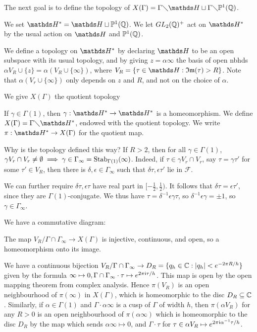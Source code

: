 \documentclass[10pt,a4paper]{article}
\begin{document}
The next goal is to define the topology of $X(\Gamma) = \Gamma \diagdown \H \sqcup \Gamma \diagdown \P^1(\Q)$.
\begin{definition}
  We set $\H^\ast = \H \sqcup \P^1(\Q)$. We let $GL_2(\mathbb{Q})^+$ act on $\H^\ast$ by the usual action on $\H$ and $\mathbb{P}^1(\mathbb{Q})$.

  We define a topology on $\H^\ast$ by declaring $\H$ to be an open subspace with its usual topology, and by giving $z = \alpha\infty$ the basis of open nbhds $\alpha V_R \cup \{z\} = \alpha(V_R \cup \{\infty\})$, where $V_R = \{\tau \in \H: \Im(\tau) > R\}$. Note that $\alpha(V_r \cup \{\infty\})$ only depends on $z$ and $R$, and not on the choice of $\alpha$.

  We give $X(\Gamma)$ the quotient topology
\end{definition}
If $\gamma \in \Gamma(1)$, then $\gamma:\H^\ast  \to \H^\ast$ is a homeomorphism. We define $X(\Gamma) = \Gamma \diagdown \H^\ast$, endowed with the quotient topology. We write $\pi : \H^\ast \to X(\Gamma)$ for the quotient map.

Why is the topology defined this way? If $R>2$, then for all $\gamma \in \Gamma(1)$, $\gamma V_r \cap V_r \neq \emptyset \implies \gamma \in \Gamma_\infty = \operatorname{Stab}_{\Gamma(1)}(\infty)$. Indeed, if $\tau \in \gamma V_r \cap V_r$, say $\tau = \gamma \tau'$ for some $\tau' \in V_R$, then there is $\delta, \epsilon \in \Gamma_\infty$ such that $\delta \tau, \epsilon \tau'$ lie in $\mathscr{F}$.

We can further require $\delta \tau, \epsilon \tau$ have real part in $[-\frac12, \frac12)$. It follows that $\delta \tau = \epsilon \tau'$, since they are $\Gamma(1)$-conjugate. We thus have $\tau = \delta^{-1}\epsilon \gamma \tau$, so $\delta^{-1}\epsilon \gamma = \pm 1$, so $\gamma \in \Gamma_\infty$.

We have a commutative diagram:
\begin{center}
\end{center}
The map $V_R/\Gamma \cap \Gamma_\infty \to X(\Gamma)$ is injective, continuous, and open, so a homeomorphism onto its image.

We have a continuous bijection $V_R/\Gamma \cap \Gamma_\infty \to D_R = \{q_h \in \mathbb{C}: |q_h| < e^{-2\pi R/h}\}$ given by the formula $\infty \mapsto 0, \Gamma\cap \Gamma_\infty \cdot \tau \mapsto e^{2\pi \mathfrak{i} \tau/h}$. This map is open by the open mapping theorem from complex analysis. Hence $\pi(V_R)$ is an open neighbourhood of $\pi(\infty)$ in $X(\Gamma)$, which is homeomorphic to the disc $D_R \subseteq \mathbb{C}$. Similarly, if $\alpha \in \Gamma(1)$ and $\Gamma \cdot \alpha\infty$ is a cusp of $\Gamma$ of width $h$, then $\pi(\alpha V_R)$ for any $R > 0$ is an open neighbourhood of $\pi(\alpha \infty)$ which is homeomorphic to the disc $D_R$ by the map which sends $\alpha \infty \mapsto 0$, and $\Gamma \cdot \tau$ for $\tau \in \alpha V_R \mapsto e^{2\pi\mathfrak{i} \alpha^{-1}\tau/h}$.
\end{document}
